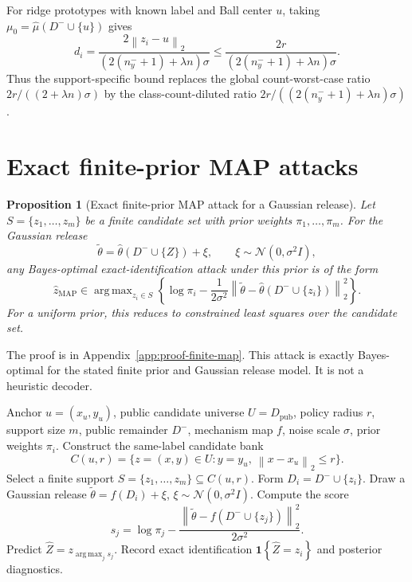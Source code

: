 \documentclass[11pt,a4paper]{report}
\theoremstyle{plain}
\newtheorem{proposition}[theorem]{Proposition}
\theoremstyle{definition}
\theoremstyle{remark}
\DeclareMathOperator*{\argmax}{arg\,max}
\newcommand{\N}{\mathcal{N}}
\newcommand{\norm}[1]{\left\lVert #1\right\rVert}
\newcommand{\ind}[1]{\mathbf{1}\!\left\{#1\right\}}
\begin{document}
For ridge prototypes with known label and Ball center $u$, taking $\mu_0=\widehat\mu(D^-\cup\{u\})$ gives
\[
d_i
=
\frac{2\norm{z_i-u}_2}{(2(n_y^-+1)+\lambda n)\sigma}
\le
\frac{2r}{(2(n_y^-+1)+\lambda n)\sigma}.
\]
Thus the support-specific bound replaces the global count-worst-case ratio $2r/((2+\lambda n)\sigma)$ by the class-count-diluted ratio $2r/((2(n_y^-+1)+\lambda n)\sigma)$.

\section{Exact finite-prior MAP attacks}
\label{sec:finite-map-gaussian}

\begin{proposition}[Exact finite-prior MAP attack for a Gaussian release]
\label{prop:finite-map}
Let $S=\{z_1,\ldots,z_m\}$ be a finite candidate set with prior weights $\pi_1,\ldots,\pi_m$.  For the Gaussian release
\[
\widetilde\theta=\widehat\theta(D^-\cup\{Z\})+\xi,
\qquad \xi\sim\N(0,\sigma^2I),
\]
any Bayes-optimal exact-identification attack under this prior is of the form
\[
\widehat z_{\mathrm{MAP}}
\in
\argmax_{z_i\in S}
\left\{
\log\pi_i
-
\frac{1}{2\sigma^2}
\norm{\widetilde\theta-\widehat\theta(D^-\cup\{z_i\})}_2^2
\right\}.
\]
For a uniform prior, this reduces to constrained least squares over the candidate set.
\end{proposition}

The proof is in Appendix~\ref{app:proof-finite-map}.  This attack is exactly Bayes-optimal for the stated finite prior and Gaussian release model.  It is not a heuristic decoder.

\begin{algorithm}[t]
\caption{Finite-prior Gaussian MAP reconstruction audit}
\label{alg:finite-prior-map}
\begin{algorithmic}[1]
\Require Anchor $u=(x_u,y_u)$, public candidate universe $U=D_{\mathrm{pub}}$, policy radius $r$, support size $m$, public remainder $D^-$, mechanism map $f$, noise scale $\sigma$, prior weights $\pi_i$.
\State Construct the same-label candidate bank
\[
C(u,r)=\{z=(x,y)\in U:y=y_u,\ \norm{x-x_u}_2\le r\}.
\]
\State Select a finite support $S=\{z_1,\ldots,z_m\}\subseteq C(u,r)$.
    \State Form $D_i=D^-\cup\{z_i\}$.
    \State Draw a Gaussian release $\widetilde\theta=f(D_i)+\xi$, $\xi\sim\N(0,\sigma^2I)$.
        \State Compute the score
        \[
        s_j=\log\pi_j-\frac{\norm{\widetilde\theta-f(D^-\cup\{z_j\})}_2^2}{2\sigma^2}.
        \]
    \EndFor
    \State Predict $\widehat Z=z_{\argmax_j s_j}$.
    \State Record exact identification $\ind{\widehat Z=z_i}$ and posterior diagnostics.
\EndFor
\end{algorithmic}
\end{algorithm}
\end{document}

